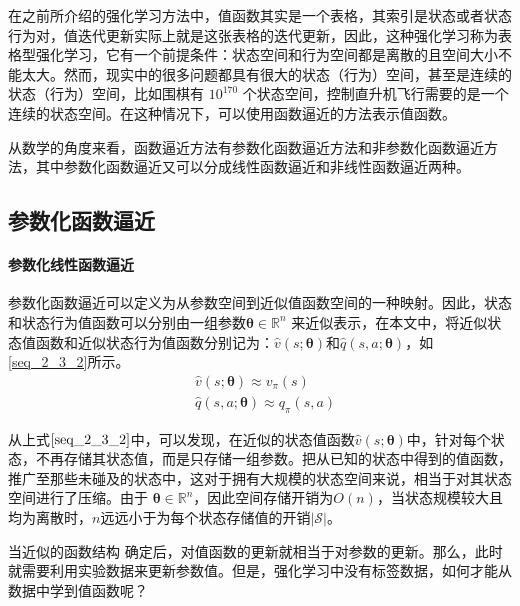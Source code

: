 在之前所介绍的强化学习方法中，值函数其实是一个表格，其索引是状态或者状态行为对，值迭代更新实际上就是这张表格的迭代更新，因此，这种强化学习称为表格型强化学习，它有一个前提条件：状态空间和行为空间都是离散的且空间大小不能太大。然而，现实中的很多问题都具有很大的状态（行为）空间，甚至是连续的状态（行为）空间，比如围棋有 $10^{170}$  个状态空间，控制直升机飞行需要的是一个连续的状态空间。在这种情况下，可以使用函数逼近的方法表示值函数。

从数学的角度来看，函数逼近方法有参数化函数逼近方法和非参数化函数逼近方法，其中参数化函数逼近又可以分成线性函数逼近和非线性函数逼近两种\citep{强化学习中值函数逼近方法的研究}。

\subsection{参数化函数逼近}

\paragraph{参数化线性函数逼近}
参数化函数逼近可以定义为从参数空间到近似值函数空间的一种映射\citep{强化学习中值函数逼近方法的研究}。因此，状态和状态行为值函数可以分别由一组参数$\bm{\theta}\in \mathbb{R}^{n} $ 来近似表示，在本文中，将近似状态值函数和近似状态行为值函数分别记为：$\hat{v}(s;\bm{\theta})$和$\hat{q}(s,a;\bm{\theta})$，如\eqref{seq_2_3_2}所示。
\begin{equation}
\label{seq_2_3_2}
\begin{aligned}
&\hat{v}(s;\bm{\theta})\approx v_{\pi}(s)\\
&\hat{q}(s,a;\bm{\theta})\approx q_{\pi}(s,a)
\end{aligned}
\end{equation}

从上式$\eqref{seq_2_3_2}$中，可以发现，在近似的状态值函数$\hat{v}(s;\bm{\theta})$中，针对每个状态，不再存储其状态值，而是只存储一组参数。把从已知的状态中得到的值函数，推广至那些未碰及的状态中，这对于拥有大规模的状态空间来说，相当于对其状态空间进行了压缩。由于 $\bm{\theta}\in \mathbb{R}^{n}$，因此空间存储开销为$O(n)$，当状态规模较大且均为离散时，$n$远远小于为每个状态存储值的开销$|\mathcal{S}|$。

当近似的函数结构
确定后，对值函数的更新就相当于对参数的更新。那么，此时就需要利用实验数据来更新参数值。但是，强化学习中没有标签数据，如何才能从数据中学到值函数呢？

